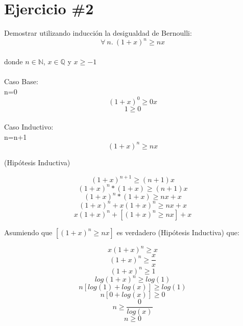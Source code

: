 \documentclass{article}
\begin{document}
\section*{Ejercicio \#2}
Demostrar utilizando inducci\'on la desigualdad de Bernoulli:
\[
        \forall\ n.\ (1+x)^n\geq nx
\]
\\donde $n\in \mathbb{N}$, $x\in \mathbb{Q}$ y $x\geq -1$\\
\\
\large{Caso Base:}\\
n=0
\[
        (1+x)^0\geq 0x
\]
\[
        1\geq 0
\]\\
\large{Caso Inductivo:}\\
n=n+1\\
\[
        (1+x)^{n}\geq nx
\]\begin{center}(Hipótesis Inductiva)\end{center}
\[
        (1+x)^{n+1}\geq (n+1)x
\]
\[
        (1+x)^n*(1+x)\geq (n+1)x
\]
\[
        (1+x)^n*(1+x)\geq nx+x
\]
\[
        (1+x)^n+x(1+x)^n\geq nx+x
\]
\[
        x(1+x)^n+[(1+x)^n\geq nx]+x
\]\begin{center}Asumiendo que $[(1+x)^n\geq nx]$ es verdadero (Hipótesis Inductiva) que:\end{center}
\[
        x(1+x)^n\geq x
\]
\[
        (1+x)^n\geq \frac{x}{x}
\]
\[
        (1+x)^n\geq 1
\]
\[
        log(1+x)^n\geq log(1)
\]
\[
        n[log(1)+log(x)]\geq log(1)
\]
\[
        n[0+log(x)]\geq 0
\]
\[
        n\geq \frac{0}{log(x)}
\]
\[
        n\geq 0
\]
\end{document}
